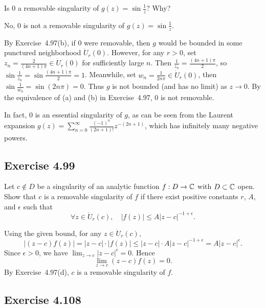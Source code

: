 \documentclass{article}
\begin{document}
Is $0$ a removable singularity of $g(z) = \sin \frac{1}{z}$? Why?

\begin{solution}
  No, $0$ is not a removable singularity of $g(z) = \sin \frac{1}{z}$.

  By Exercise~4.97(b), if $0$ were removable, then $g$ would be bounded in some
  punctured neighborhood $\dot{U}_r(0)$. However, for any $r > 0$, set
  $z_n = \frac{2}{(4n+1)\pi} \in \dot{U}_r(0)$ for sufficiently large $n$.
  Then $\frac{1}{z_n} = \frac{(4n+1)\pi}{2}$, so
  $\sin\frac{1}{z_n} = \sin\frac{(4n+1)\pi}{2} = 1$.
  Meanwhile, set $w_n = \frac{1}{2n\pi} \in \dot{U}_r(0)$, then
  $\sin\frac{1}{w_n} = \sin(2n\pi) = 0$.
  Thus $g$ is not bounded (and has no limit) as $z \to 0$. By the equivalence
  of (a) and (b) in Exercise~4.97, $0$ is not removable.

  In fact, $0$ is an essential singularity of $g$, as can be seen from the
  Laurent expansion $g(z) = \sum_{n=0}^{\infty} \frac{(-1)^n}{(2n+1)!} z^{-(2n+1)}$,
  which has infinitely many negative powers.
\end{solution}

\subsection{Exercise 4.99}

Let $c \notin D$ be a singularity of an analytic function $f : D \to \mathbb{C}$ with
$D \subset \mathbb{C}$ open. Show that $c$ is a removable singularity of $f$ if there
exist positive constants $r$, $A$, and $\epsilon$ such that
\[
  \forall z \in \dot{U}_r(c), \quad |f(z)| \le A |z - c|^{-1 + \epsilon}.
\]

\begin{solution}
  Using the given bound, for any $z \in \dot{U}_r(c)$,
  \[
    |(z - c)f(z)| = |z - c| \cdot |f(z)|
    \le |z - c| \cdot A |z - c|^{-1 + \epsilon}
    = A |z - c|^{\epsilon}.
  \]
  Since $\epsilon > 0$, we have $\lim_{z \to c} |z - c|^{\epsilon} = 0$. Hence
  \[
    \lim_{z \to c} (z - c)f(z) = 0.
  \]
  By Exercise~4.97(d), $c$ is a removable singularity of $f$.
\end{solution}

\subsection{Exercise 4.108}
\end{document}
